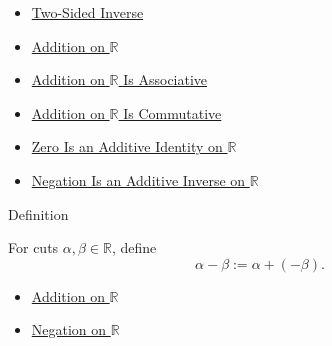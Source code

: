 \begin{dependencies}
\begin{itemize}
  \item \hyperref[def:two-sided-inverse]{Two-Sided Inverse}
  \item \hyperref[def:addition-on-r]{Addition on $\mathbb{R}$}
  \item \hyperref[thm:addition-on-r-associative]{Addition on $\mathbb{R}$ Is Associative}
  \item \hyperref[thm:addition-on-r-commutative]{Addition on $\mathbb{R}$ Is Commutative}
  \item \hyperref[thm:zero-additive-identity-on-r]{Zero Is an Additive Identity on $\mathbb{R}$}
  \item \hyperref[thm:negation-additive-inverse-on-r]{Negation Is an Additive Inverse on $\mathbb{R}$}
\end{itemize}
\end{dependencies}

\begin{definitionbox}{Definition}
\begin{definition}
\label{def:subtraction-on-r}
For cuts $\alpha,\beta\in\mathbb{R}$, define
\[
\alpha-\beta:=\alpha+(-\beta).
\]
\end{definition}
\end{definitionbox}

\begin{dependencies}
\begin{itemize}
  \item \hyperref[def:addition-on-r]{Addition on $\mathbb{R}$}
  \item \hyperref[def:negation-on-r]{Negation on $\mathbb{R}$}
\end{itemize}
\end{dependencies}
